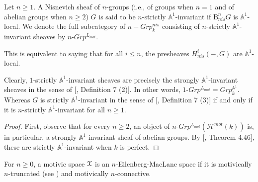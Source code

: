 \begin{defn}
 Let $n\geq 1$. A Nisnevich sheaf of $n$-groups (i.e., of groups when $n=1$ and of abelian groups when $n\geq 2$) $G$ is said to be $n$-strictly $\mathbb{A}^1$-invariant if $\mathrm{B}^n_{nis}G$ is $\mathbb{A}^1$-local. We denote the full subcategory of $n-Grp^{nis}_k$ consisting of $n$-strictly $\mathbb{A}^1$-invariant sheaves by $n\mbox{-}Grp^{L_{mot}}$.
\end{defn}  
\begin{rem}
This is equivalent to saying that for all $i\leq n$, the presheaves $H^i_{nis}(-,G)$ are $\mathbb{A}^1$-local.
\end{rem}
\begin{rem}
    Clearly, $1$-strictly $\mathbb{A}^1$-invariant sheaves are precisely the strongly $\mathbb{A}^1$-invariant sheaves in the sense of [\cite{morel2012a1}, Definition 7 (2)]. In other words, $1\mbox{-}Grp^{L_{mot}}=Grp^{\mathbb{A}^1}_k$. Whereas $G$ is strictly $\mathbb{A}^1$-invariant in the sense of [\cite{morel2012a1}, Definition 7 (3)] if and only if it is $n$-strictly $\mathbb{A}^1$-invariant for all $n\geq 1$. 
\end{rem}
\begin{proof}
    First, observe that for every $n\geq 2$, an object of $n\mbox{-}Grp^{L_{mot}}(\mathcal{H}^{mot}(k))$ is, in particular, a strongly $\mathbb{A}^1$-invariant sheaf of abelian groups. By [\cite{morel2012a1}, Theorem 4.46], these are strictly $\mathbb{A}^1$-invariant when $k$ is perfect.
\end{proof}  

\begin{defn}
 For $n\geq 0$, a motivic space $\EuScript{X}$ is an $n$-Eilenberg-MacLane space if it is motivically $n$-truncated (see ) and motivically $n$-connective. 
\end{defn} 


